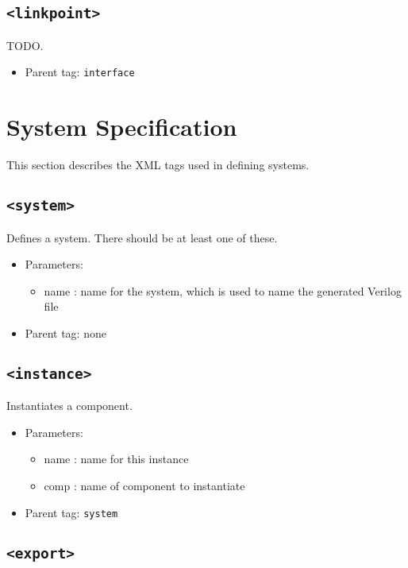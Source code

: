 \documentclass{article}
\begin{document}
\subsection{\texttt{<linkpoint>}}

TODO.

\begin{itemize}
\item{Parent tag: \texttt{interface}}
\end{itemize}

\section{System Specification}

This section describes the XML tags used in defining systems.

\subsection{\texttt{<system>}}

Defines a system. There should be at least one of these.

\begin{itemize}
\item{Parameters:}
\begin{itemize}
\item{name : name for the system, which is used to name the generated Verilog file}
\end{itemize}
\item{Parent tag: none}
\end{itemize}

\subsection{\texttt{<instance>}}

Instantiates a component.

\begin{itemize}
\item{Parameters:}
\begin{itemize}
\item{name : name for this instance}
\item{comp : name of component to instantiate}
\end{itemize}
\item{Parent tag: \texttt{system}}
\end{itemize}

\subsection{\texttt{<export>}}
\end{document}
